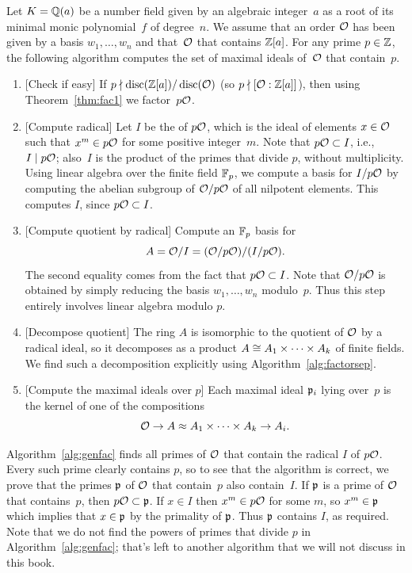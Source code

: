 \begin{algorithm}\label{alg:genfac}
Let $K=\mathbb{Q}(a)$ be a number field given
by an algebraic integer~$a$ as a root of its
minimal monic polynomial~$f$ of degree~$n$.
We assume that an order $\mathcal{O}$ has been
given by a basis $w_1,\ldots,w_n$
and that~$\mathcal{O}$ that contains $\mathbb{Z}[a]$.
For any prime $p\in\mathbb{Z}$, the following
algorithm computes the set of maximal ideals of~$\mathcal{O}$ that contain~$p$.
\begin{enumerate}
\item{} [Check if easy] If $p\nmid \operatorname{disc}(\mathbb{Z}[a]) / \operatorname{disc}(\mathcal{O})$ (so
$p\nmid [\mathcal{O}:\mathbb{Z}[a]]$), then using Theorem~\ref{thm:fac1} we
factor~$p\mathcal{O}$.
\item{} [Compute radical]
Let $I$ be the  of $p\mathcal{O}$, which is the ideal of
elements $x\in\mathcal{O}$ such that $x^m\in p\mathcal{O}$
for some positive integer~$m$.  Note that $p\mathcal{O} \subset I$, i.e.,
$I\mid p\mathcal{O}$; also~$I$ is the product
of the primes that divide $p$, without multiplicity.
Using linear algebra over the finite field
$\mathbb{F}_p$, we compute a basis for $I/p\mathcal{O}$ by computing
the abelian subgroup of $\mathcal{O}/p\mathcal{O}$ of all nilpotent
elements.  This computes $I$, since $p\mathcal{O}\subset I$.
\item{} [Compute quotient by radical]
Compute an $\mathbb{F}_p$ basis for
$$
  A = \mathcal{O}/I = (\mathcal{O}/p\mathcal{O})/(I/p\mathcal{O}).
$$
The second equality comes from the fact that $p\mathcal{O}\subset I$.
Note that $\mathcal{O}/p\mathcal{O}$
is obtained by simply reducing the basis $w_1,\ldots, w_n$ modulo~$p$.
Thus this step entirely involves linear algebra modulo $p$.

\item{} [Decompose quotient] The ring $A$ is isomorphic to
the quotient of $\mathcal{O}$ by a radical ideal,
so it decomposes as a product
$A \cong A_1 \times \cdots \times A_k$ of finite fields.
We find such a decomposition explicitly using Algorithm~\ref{alg:factorsep}.

\item{} [Compute the maximal ideals over $p$] Each maximal ideal
  $\mathfrak{p}_i$ lying over~$p$ is the kernel of one of the compositions
$$\mathcal{O} \to A \approx A_1 \times \cdots \times A_k \to A_i.$$
\end{enumerate}
\end{algorithm}
Algorithm~\ref{alg:genfac} finds all primes of $\mathcal{O}$ that contain the radical $I$ of
$p\mathcal{O}$.  Every such prime clearly contains $p$, so to see that the
algorithm is correct, we prove that the primes $\mathfrak{p}$ of $\mathcal{O}$ that
contain~$p$ also contain~$I$.  If $\mathfrak{p}$ is a prime of $\mathcal{O}$ that
contains~$p$, then $p\mathcal{O} \subset \mathfrak{p}$.  If $x\in I$ then $x^m\in p\mathcal{O}$
for some $m$, so $x^m\in \mathfrak{p}$ which implies that $x\in \mathfrak{p}$ by the primality
of $\mathfrak{p}$.  Thus $\mathfrak{p}$ contains $I$, as required.  Note that we do not find the powers of
primes that divide $p$ in Algorithm~\ref{alg:genfac}; that's left to another
algorithm that we will not discuss in this book.

